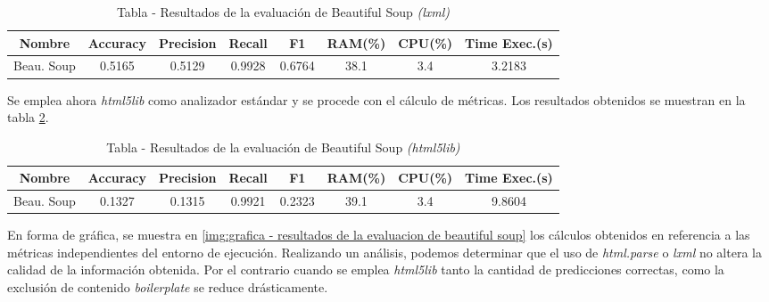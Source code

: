 \begin{table}[h]
    \begin{center}
      \begin{tabular}{| c | c | c | c | c | c | c | c |} \hline 
       \textbf{Nombre} & \textbf{Accuracy} & \textbf{Precision}  & \textbf{Recall} & \textbf{F1} & \textbf{RAM(\%)} & \textbf{CPU(\%)} & \textbf{Time Exec.(s)} \\ \hline
       Beau. Soup & 0.5165 & 0.5129 & 0.9928 & 0.6764 & 38.1 & 3.4 & 3.2183 \\ \hline
      \end{tabular}
      \caption{Tabla - Resultados de la evaluación de Beautiful Soup \emph{(lxml)}}
      \label{tab:tabla - resultados de la evaluacion de beautiful soup lxml}
    \end{center}
\end{table}

Se emplea ahora \emph{html5lib} como analizador estándar y se procede con el cálculo de métricas. Los 
resultados obtenidos se muestran en la tabla 
\ref{tab:tabla - resultados de la evaluacion de beautiful soup html5lib}.

\begin{table}[h]
    \begin{center}
      \begin{tabular}{| c | c | c | c | c | c | c | c |} \hline 
       \textbf{Nombre} & \textbf{Accuracy} & \textbf{Precision}  & \textbf{Recall} & \textbf{F1} & \textbf{RAM(\%)} & \textbf{CPU(\%)} & \textbf{Time Exec.(s)} \\ \hline
       Beau. Soup & 0.1327 & 0.1315 & 0.9921 & 0.2323 & 39.1 & 3.4 & 9.8604 \\ \hline
      \end{tabular}
      \caption{Tabla - Resultados de la evaluación de Beautiful Soup \emph{(html5lib)}}
      \label{tab:tabla - resultados de la evaluacion de beautiful soup html5lib}
    \end{center}
\end{table}

En forma de gráfica, se muestra en \ref{img:grafica - resultados de la evaluacion de beautiful soup} los 
cálculos obtenidos en referencia a las métricas independientes del entorno de ejecución. Realizando un
análisis, podemos determinar que el uso de \emph{html.parse} o \emph{lxml} no altera la calidad de la 
información obtenida. Por el contrario cuando se emplea \emph{html5lib} tanto la cantidad de predicciones 
correctas, como la exclusión de contenido \emph{boilerplate} se reduce drásticamente.

